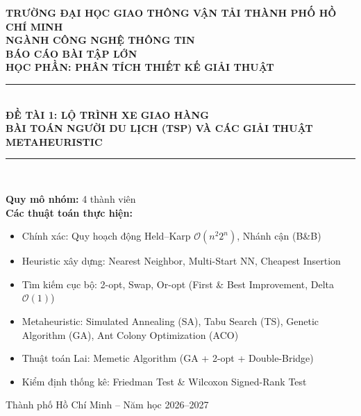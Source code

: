 \documentclass[12pt,a4paper]{report}
\begin{document}
\begin{titlepage}
    \centering
    \vspace*{1cm}
    {\large \textbf{TRƯỜNG ĐẠI HỌC GIAO THÔNG VẬN TẢI THÀNH PHỐ HỒ CHÍ MINH}}\\[0.3cm]
    {\normalsize \textbf{NGÀNH CÔNG NGHỆ THÔNG TIN}}\\[3.5cm]

    {\huge \textbf{BÁO CÁO BÀI TẬP LỚN}}\\[0.6cm]
    {\Large \textbf{HỌC PHẦN: PHÂN TÍCH THIẾT KẾ GIẢI THUẬT}}\\[1.2cm]

    \rule{0.7\textwidth}{0.8pt}\\[0.6cm]
    {\LARGE \textbf{ĐỀ TÀI 1: LỘ TRÌNH XE GIAO HÀNG}}\\[0.3cm]
    {\Large \textbf{BÀI TOÁN NGƯỜI DU LỊCH (TSP) VÀ CÁC GIẢI THUẬT METAHEURISTIC}}\\[0.6cm]
    \rule{0.7\textwidth}{0.8pt}\\[2.5cm]

    \begin{flushleft}
    \hspace{2.5cm}\textbf{Quy mô nhóm:} 4 thành viên\\
    \hspace{2.5cm}\textbf{Các thuật toán thực hiện:}
    \begin{itemize}
        \setlength{\itemindent}{2.8cm}
        \item Chính xác: Quy hoạch động Held--Karp $\mathcal{O}(n^2 2^n)$, Nhánh cận (B\&B)
        \item Heuristic xây dựng: Nearest Neighbor, Multi-Start NN, Cheapest Insertion
        \item Tìm kiếm cục bộ: 2-opt, Swap, Or-opt (First \& Best Improvement, Delta $\mathcal{O}(1)$)
        \item Metaheuristic: Simulated Annealing (SA), Tabu Search (TS), Genetic Algorithm (GA), Ant Colony Optimization (ACO)
        \item Thuật toán Lai: Memetic Algorithm (GA + 2-opt + Double-Bridge)
        \item Kiểm định thống kê: Friedman Test \& Wilcoxon Signed-Rank Test
    \end{itemize}
    \end{flushleft}

    \vfill
    {\normalsize Thành phố Hồ Chí Minh -- Năm học 2026--2027}
\end{titlepage}
\end{document}
